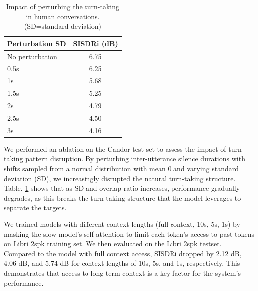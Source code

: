 {\begin{table}[t!]
\caption{Impact of perturbing the turn-taking in human conversations.  (SD=standard deviation)}
\vskip -0.1in
\centering
  \setlength{\tabcolsep}{6pt} %
{\footnotesize
\begin{tabular}{lc}
\toprule
\textbf{Perturbation SD} & \textbf{SISDRi (dB)} \\ %
\midrule
No perturbation & 6.75 \\ %
0.5s            & 6.25 \\%
1s              & 5.68 \\%
1.5s            & 5.25 \\%
2s              & 4.79 \\%
2.5s            & 4.50 \\%
3s              & 4.16 \\%
\bottomrule
\end{tabular}
}
\label{tab:perturbation}
\vskip -0.15in
\end{table}


\vskip 0.02in {We performed an ablation on the Candor test set to assess the impact of turn-taking pattern disruption. By perturbing inter-utterance silence durations with shifts sampled from a normal distribution with mean 0 and varying standard deviation (SD), we increasingly disrupted the natural turn-taking structure. Table.  \ref{tab:perturbation} shows that as SD and overlap ratio increases, performance gradually degrades, as this breaks the turn-taking structure that the model leverages to separate the targets.} %

\vskip 0.02in {We trained models with different context lengths (full context, 10s, 5s, 1s) by masking the slow model’s self-attention to limit each token's access to past tokens on Libri 2spk training set. We then evaluated on the Libri 2spk testset. Compared to the model with full context access, SISDRi dropped by 2.12 dB, 4.06 dB, and 5.74 dB for context lengths of 10s, 5s, and 1s, respectively. This demonstrates that access to long-term context is a key factor for the system's performance.}



}
